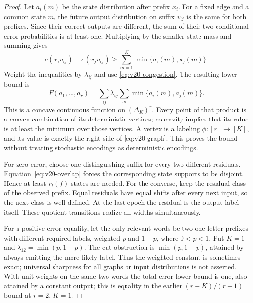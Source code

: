 \begin{proof}
Let $a_i(m)$ be the state distribution after prefix $x_i$. For a fixed
edge and a common state $m$, the future output distribution on suffix
$v_{ij}$ is the same for both prefixes. Since their correct outputs are
different, the sum of their two conditional error probabilities is at
least one. Multiplying by the smaller state mass and summing gives
\begin{equation}\label{eq:v20-overlap}
 e(x_iv_{ij})+e(x_jv_{ij})
 \ge \sum_{m=1}^K\min\{a_i(m),a_j(m)\}.
\end{equation}
Weight the inequalities by $\lambda_{ij}$ and use
\eqref{eq:v20-congestion}. The resulting lower bound is
\[
 F(a_1,\ldots,a_r)=\sum_{ij}\lambda_{ij}
                              \sum_m\min\{a_i(m),a_j(m)\}.
\]
This is a concave continuous function on $(\Delta_K)^r$. Every point
of that product is a convex combination of its deterministic vertices;
concavity implies that its value is at least the minimum over those
vertices. A vertex is a labeling $\phi:[r]\to[K]$, and its value is
exactly the right side of \eqref{eq:v20-graph}. This proves the bound
without treating stochastic encodings as deterministic encodings.

For zero error, choose one distinguishing suffix for every two different
residuals. Equation~\eqref{eq:v20-overlap} forces the corresponding state
supports to be disjoint. Hence at least $r_t(f)$ states are needed.
For the converse, keep the residual class of the observed prefix. Equal
residuals have equal shifts after every next input, so the next class is
well defined. At the last epoch the residual is the output label itself.
These quotient transitions realize all widths simultaneously.

For a positive-error equality, let the only relevant words be two
one-letter prefixes with different required labels, weighted $p$ and
$1-p$, where $0<p<1$. Put $K=1$ and
$\lambda_{12}=\min(p,1-p)$. The cut obstruction is $\min(p,1-p)$,
attained by always emitting the more likely label. Thus the weighted
constant is sometimes exact; universal sharpness for all graphs or
input distributions is not asserted. With unit weights on the same two
words the total-error lower bound is one, also attained by a constant
output; this is equality in the earlier $(r-K)/(r-1)$ bound at $r=2$,
$K=1$.
\end{proof}

